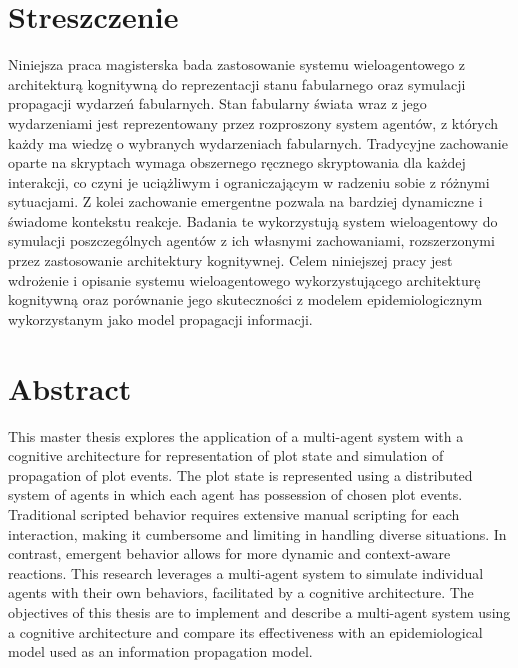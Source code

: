 \section*{Streszczenie}

Niniejsza praca magisterska bada zastosowanie systemu wieloagentowego z architekturą kognitywną do reprezentacji stanu fabularnego oraz symulacji propagacji wydarzeń fabularnych. Stan fabularny świata wraz z jego wydarzeniami jest reprezentowany przez rozproszony system agentów, z których każdy ma wiedzę o wybranych wydarzeniach fabularnych. Tradycyjne zachowanie oparte na skryptach wymaga obszernego ręcznego skryptowania dla każdej interakcji, co czyni je uciążliwym i ograniczającym w radzeniu sobie z różnymi sytuacjami. Z kolei zachowanie emergentne pozwala na bardziej dynamiczne i świadome kontekstu reakcje. Badania te wykorzystują system wieloagentowy do symulacji poszczególnych agentów z ich własnymi zachowaniami, rozszerzonymi przez zastosowanie architektury kognitywnej. Celem niniejszej pracy jest wdrożenie i opisanie systemu wieloagentowego wykorzystującego architekturę kognitywną oraz porównanie jego skuteczności z modelem epidemiologicznym wykorzystanym jako model propagacji informacji.

\section*{Abstract}

This master thesis explores the application of a multi-agent system with a cognitive architecture for representation of plot state and simulation of propagation of plot events. The plot state is represented using a distributed system of agents in which each agent has possession of chosen plot events. Traditional scripted behavior requires extensive manual scripting for each interaction, making it cumbersome and limiting in handling diverse situations. In contrast, emergent behavior allows for more dynamic and context-aware reactions. This research leverages a multi-agent system to simulate individual agents with their own behaviors, facilitated by a cognitive architecture. The objectives of this thesis are to implement and describe a multi-agent system using a cognitive architecture and compare its effectiveness with an epidemiological model used as an information propagation model.